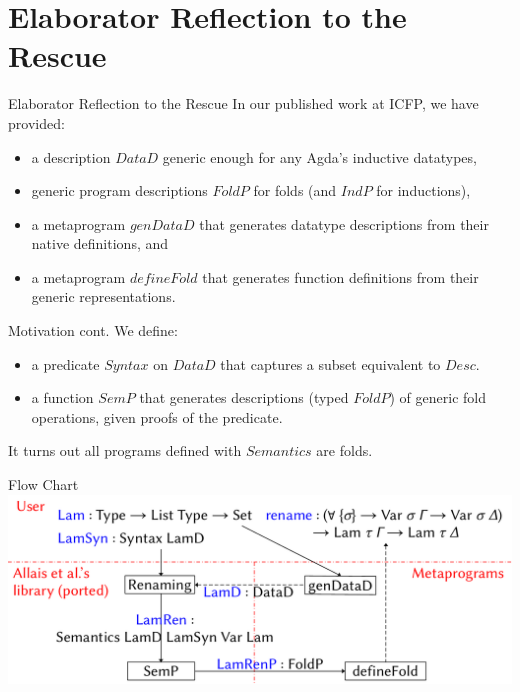 \documentclass[10pt,xcolor=svgnames]{beamer} %
\newcommand{\mi}[1]{\ensuremath{\mathit{#1}}}
\begin{document}
\section{Elaborator Reflection to the Rescue}

\begin{frame}[fragile]{Elaborator Reflection to the Rescue}
	In our published work at ICFP, we have provided:
	\pause
	\begin{itemize}
		\item a description \mi{DataD} generic enough for any Agda's inductive datatypes,
		\pause
		\item generic program descriptions \mi{FoldP} for folds (and \mi{IndP} for inductions),
		\pause
		\item a metaprogram \mi{genDataD} that generates datatype descriptions from their native definitions, and 
		\pause
		\item a metaprogram \mi{defineFold} that generates function definitions from their generic representations.
	\end{itemize}
\end{frame}

\begin{frame}[fragile]{Motivation cont.}
	We define:
	\begin{itemize}
		\item a predicate \mi{Syntax} on \mi{DataD} that captures a subset equivalent to \mi{Desc}.
		\item a function \mi{SemP} that generates descriptions (typed \mi{FoldP}) of generic fold operations, given proofs of the predicate.
	\end{itemize}
It turns out all programs defined with \mi{Semantics} are folds.
\end{frame}

\begin{frame}[fragile]{Flow Chart}
\includegraphics[width=\columnwidth]{Diagram.pdf}
\end{frame}
\end{document}
